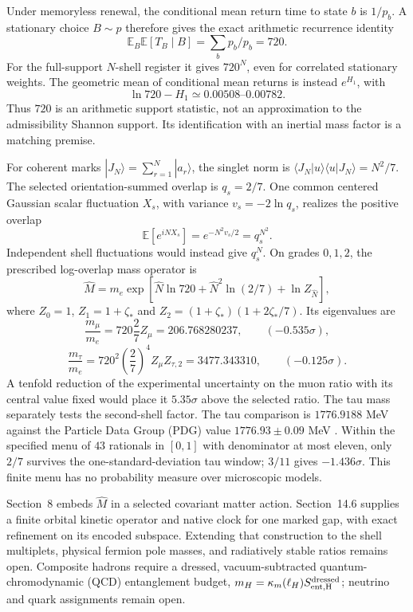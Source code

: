 \documentclass[11pt]{article}
\begin{document}
Under memoryless renewal, the conditional mean return time to state $b$ is $1/p_b$. A stationary choice $B\sim p$ therefore gives the exact arithmetic recurrence identity \citep{Kac1947}
\[
\mathbb E_B\mathbb E[T_B\mid B]=\sum_b p_b/p_b=720.
\]
For the full-support $N$-shell register it gives $720^N$, even for correlated stationary weights. The geometric mean of conditional mean returns is instead $e^{H_1}$, with
\[
\ln720-H_1\simeq0.00508\text{--}0.00782.
\]
Thus $720$ is an arithmetic support statistic, not an approximation to the admissibility Shannon support. Its identification with an inertial mass factor is a matching premise.

For coherent marks $|J_N\rangle=\sum_{r=1}^N|a_r\rangle$, the singlet norm is $\langle J_N|u\rangle\langle u|J_N\rangle=N^2/7$. The selected orientation-summed overlap is $q_s=2/7$. One common centered Gaussian scalar fluctuation $X_s$, with variance $v_s=-2\ln q_s$, realizes the positive overlap
\[
\mathbb E[e^{iNX_s}]=e^{-N^2v_s/2}=q_s^{N^2}.
\]
Independent shell fluctuations would instead give $q_s^N$. On grades $0,1,2$, the prescribed log-overlap mass operator is
\[
\boxed{\widehat M=m_e\exp[\widehat N\ln720+
\widehat N^2\ln(2/7)+\ln Z_{\widehat N}]},
\]
where $Z_0=1$, $Z_1=1+\zeta_*$ and $Z_2=(1+\zeta_*)(1+2\zeta_*/7)$. Its eigenvalues are
\[
\frac{m_\mu}{m_e}=720\frac27Z_\mu=206.768280237,
\qquad (-0.535\sigma),
\]
\[
\frac{m_\tau}{m_e}=720^2\left(\frac27\right)^4Z_\mu Z_{\tau,2}
=3477.343310,\qquad (-0.125\sigma).
\]
A tenfold reduction of the experimental uncertainty on the muon ratio
with its central value fixed would place it $5.35\sigma$ above the
selected ratio. The tau mass separately tests the second-shell factor.
The tau comparison is $1776.9188$ MeV against the Particle Data Group (PDG) value $1776.93\pm0.09$ MeV \citep{PDG2026Astra}. Within the specified menu of $43$ rationals in $[0,1]$ with denominator at most eleven, only $2/7$ survives the one-standard-deviation tau window; $3/11$ gives $-1.436\sigma$. This finite menu has no probability measure over microscopic models.

Section~8 embeds $\widehat M$ in a selected covariant matter action. Section~14.6 supplies a finite orbital kinetic operator and native clock for one marked gap, with exact refinement on its encoded subspace. Extending that construction to the shell multiplets, physical fermion pole masses, and radiatively stable ratios remains open. Composite hadrons require a dressed, vacuum-subtracted quantum-chromodynamic (QCD) entanglement budget, $m_H=\kappa_m(\ell_H)S_{\rm ent,H}^{\rm dressed}$; neutrino and quark assignments remain open.
\end{document}
